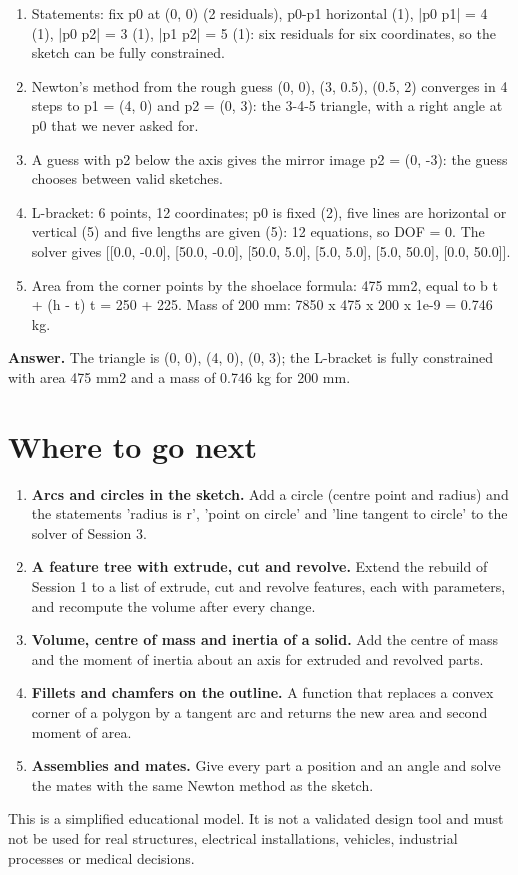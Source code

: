 \documentclass[11pt,a4paper]{article}
\begin{document}
\begin{enumerate}[nosep]
\item Statements: fix p0 at (0, 0) (2 residuals), p0-p1 horizontal (1), |p0 p1| = 4 (1), |p0 p2| = 3 (1), |p1 p2| = 5 (1): six residuals for six coordinates, so the sketch can be fully constrained.
\item Newton's method from the rough guess (0, 0), (3, 0.5), (0.5, 2) converges in 4 steps to p1 = (4, 0) and p2 = (0, 3): the 3-4-5 triangle, with a right angle at p0 that we never asked for.
\item A guess with p2 below the axis gives the mirror image p2 = (0, -3): the guess chooses between valid sketches.
\item L-bracket: 6 points, 12 coordinates; p0 is fixed (2), five lines are horizontal or vertical (5) and five lengths are given (5): 12 equations, so DOF = 0. The solver gives [[0.0, -0.0], [50.0, -0.0], [50.0, 5.0], [5.0, 5.0], [5.0, 50.0], [0.0, 50.0]].
\item Area from the corner points by the shoelace formula: 475 mm2, equal to b t + (h - t) t = 250 + 225. Mass of 200 mm: 7850 x 475 x 200 x 1e-9 = 0.746 kg.
\end{enumerate}
\textbf{Answer.} The triangle is (0, 0), (4, 0), (0, 3); the L-bracket is fully constrained with area 475 mm2 and a mass of 0.746 kg for 200 mm.

\section*{Where to go next}
\begin{enumerate}[nosep]
\item \textbf{Arcs and circles in the sketch.} Add a circle (centre point and radius) and the statements 'radius is r', 'point on circle' and 'line tangent to circle' to the solver of Session 3.
\item \textbf{A feature tree with extrude, cut and revolve.} Extend the rebuild of Session 1 to a list of extrude, cut and revolve features, each with parameters, and recompute the volume after every change.
\item \textbf{Volume, centre of mass and inertia of a solid.} Add the centre of mass and the moment of inertia about an axis for extruded and revolved parts.
\item \textbf{Fillets and chamfers on the outline.} A function that replaces a convex corner of a polygon by a tangent arc and returns the new area and second moment of area.
\item \textbf{Assemblies and mates.} Give every part a position and an angle and solve the mates with the same Newton method as the sketch.
\end{enumerate}

This is a simplified educational model. It is not a validated design tool and must not be used for real structures, electrical installations, vehicles, industrial processes or medical decisions.
\end{document}
